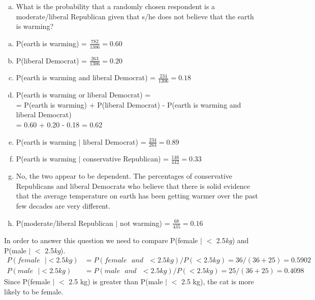 {{\begin{enumerate}[(a)]
\item What is the probability that a randomly chosen respondent is a moderate/liberal Republican given that s/he does not believe that the earth is warming? 
\end{enumerate}
}
{
\begin{enumerate}[(a)]
\setlength{\itemsep}{0mm}
\item P(earth is warming) = $\frac{782}{1306} = 0.60$
\item P(liberal Democrat) = $\frac{263}{1306} = 0.20$
\item P(earth is warming and liberal Democrat) = $\frac{234}{1306} = 0.18$
\item P(earth is warming or liberal Democrat) = \\
= P(earth is warming) + P(liberal Democrat)  - P(earth is warming and liberal Democrat) \\
= 0.60 + 0.20 - 0.18 = 0.62
\item P(earth is warming $|$ liberal Democrat) = $\frac{234}{263} = 0.89$
\item P(earth is warming $|$ conservative Republican) = $\frac{146}{442} = 0.33$
\item No, the two appear to be dependent. The percentages of conservative Republicans and liberal Democrats who believe that there is solid evidence that the average temperature on earth has been getting warmer over the past few decades are very different.
\item P(moderate/liberal Republican $|$ not warming) = $\frac{68}{435} = 0.16$
\end{enumerate}
}
}


{
In order to answer this question we need to compare P(female $|$ $<$ 2.5\textit{kg}) and P(male $|$ $<$ 2.5\textit{kg}).
\begin{align*}
P(female\text{ }| < 2.5 kg) &= P(female\text{ }and\text{ }< 2.5 kg)  / P(< 2.5 kg)  = 36 / (36 + 25) = 0.5902 \\
P(male\text{ }| < 2.5 kg) &= P(male\text{ }and\text{ }< 2.5 kg)  / P(< 2.5 kg)  = 25 / (36 + 25) = 0.4098
\end{align*}
Since P(female $|$ $<$ 2.5 kg) is greater than P(male $|$ $<$ 2.5 kg), the cat is more likely to be female.
}

